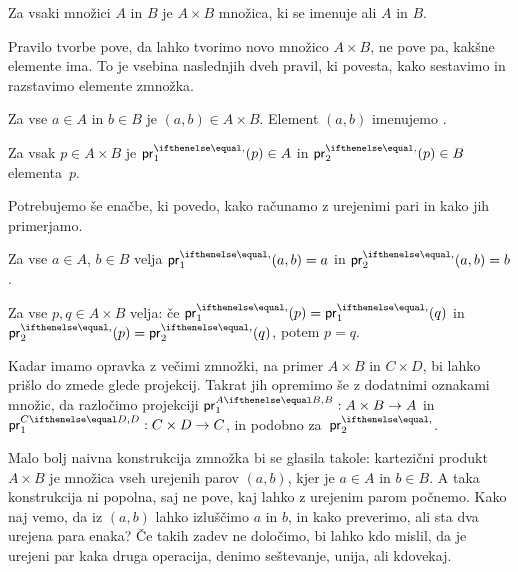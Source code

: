 \begin{pravilo}
  \label{pravilo:zmnozek-tvorba}
  Za vsaki množici $A$ in $B$ je $A \times B$ množica, ki se imenuje  ali
   $A$ in $B$.
\end{pravilo}

\noindent
%
Pravilo tvorbe pove, da lahko tvorimo novo množico $A \times B$, ne pove pa, kakšne
elemente ima. To je vsebina naslednjih dveh pravil, ki povesta, kako sestavimo in
razstavimo elemente zmnožka.

\begin{pravilo}
  \label{pravilo:zmnozek-vpeljava}
  Za vse $a \in A$ in $b \in B$ je $(a, b) \in A \times B$. Element $(a, b)$ imenujemo
  .
\end{pravilo}

\begin{pravilo}
  \label{pravilo:zmnozek-uporaba}
  Za vsak $p \in A \times B$ je $\fst(p) \in A$  in $\snd(p) \in B$
   elementa~$p$.
\end{pravilo}

\noindent
Potrebujemo še enačbe, ki povedo, kako računamo z urejenimi pari in kako jih primerjamo.

\begin{pravilo}
  \label{pravilo:zmnozek-racunanje}
  Za vse $a \in A$, $b \in B$ velja $\fst(a, b) = a$ in $\snd(a, b) = b$.
\end{pravilo}

\begin{pravilo}
  \label{pravilo:zmnozek-ekstenzionalnost}
  Za vse $p, q \in A \times B$ velja: če $\fst(p) = \fst(q)$ in $\snd(p) = \snd(q)$,
  potem $p = q$.
\end{pravilo}

Kadar imamo opravka z večimi zmnožki, na primer $A \times B$ in $C \times D$, bi lahko
prišlo do zmede glede projekcij. Takrat jih opremimo še z dodatnimi oznakami množic, da
razločimo projekciji $\fst[A][B] : A \times B \to A$ in $\fst[C][D] : C \times D \to C$,
in podobno za~$\snd$.

Malo bolj naivna konstrukcija zmnožka bi se glasila takole: kartezični produkt
$A \times B$ je množica vseh urejenih parov $(a, b)$, kjer je $a \in A$ in $b \in B$. A
taka konstrukcija ni popolna, saj ne pove, kaj lahko z urejenim parom počnemo. Kako naj
vemo, da iz $(a, b)$ lahko izluščimo $a$ in $b$, in kako preverimo, ali sta dva urejena
para enaka? Če takih zadev ne določimo, bi lahko kdo mislil, da je urejeni par kaka druga
operacija, denimo seštevanje, unija, ali kdovekaj.

